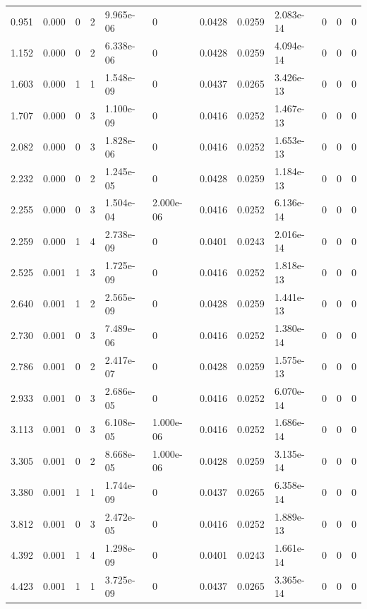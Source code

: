 \documentclass[preview]{standalone}
\begin{document}
{{\begin{tabular}{L{1.2cm}C{1.2cm} C{0.3cm}C{0.5cm} C{1.4cm}C{1.4cm} C{1.4cm}C{1.4cm} C{1.6cm}C{1.6cm} C{1.6cm}C{1.6cm}}
  0.951  &  0.000  & 0     &  2 &  9.965e-06  & 0  &  0.0428&   0.0259& 2.083e-14 & 0   &  0 & 0  \\ 
  1.152  &  0.000  & 0     &  2 &  6.338e-06  & 0  &  0.0428&   0.0259& 4.094e-14 & 0   &  0 & 0  \\ 
  1.603  &  0.000  & 1     &  1 &  1.548e-09  & 0  &  0.0437&   0.0265& 3.426e-13 & 0   &  0 & 0  \\ 
  1.707  &  0.000  & 0     &  3 &  1.100e-09  & 0  &  0.0416&   0.0252& 1.467e-13 & 0   &  0 & 0  \\ 
  2.082  &  0.000  & 0     &  3 &  1.828e-06  & 0  &  0.0416&   0.0252& 1.653e-13 & 0   &  0 & 0  \\ 
  2.232  &  0.000  & 0     &  2 &  1.245e-05  & 0  &  0.0428&   0.0259& 1.184e-13 & 0   &  0 & 0  \\ 
  2.255  &  0.000  & 0     &  3 &  1.504e-04  & 2.000e-06  &  0.0416&   0.0252& 6.136e-14 & 0   &  0 & 0  \\ 
  2.259  &  0.000  & 1     &  4 &  2.738e-09  & 0  &  0.0401&   0.0243& 2.016e-14 & 0   &  0 & 0  \\ 
  2.525  &  0.001  & 1     &  3 &  1.725e-09  & 0  &  0.0416&   0.0252& 1.818e-13 & 0   &  0 & 0  \\ 
  2.640  &  0.001  & 1     &  2 &  2.565e-09  & 0  &  0.0428&   0.0259& 1.441e-13 & 0   &  0 & 0  \\ 
  2.730  &  0.001  & 0     &  3 &  7.489e-06  & 0  &  0.0416&   0.0252& 1.380e-14 & 0   &  0 & 0  \\ 
  2.786  &  0.001  & 0     &  2 &  2.417e-07  & 0  &  0.0428&   0.0259& 1.575e-13 & 0   &  0 & 0  \\ 
  2.933  &  0.001  & 0     &  3 &  2.686e-05  & 0  &  0.0416&   0.0252& 6.070e-14 & 0   &  0 & 0  \\ 
  3.113  &  0.001  & 0     &  3 &  6.108e-05  & 1.000e-06  &  0.0416&   0.0252& 1.686e-14 & 0   &  0 & 0  \\ 
  3.305  &  0.001  & 0     &  2 &  8.668e-05  & 1.000e-06  &  0.0428&   0.0259& 3.135e-14 & 0   &  0 & 0  \\ 
  3.380  &  0.001  & 1     &  1 &  1.744e-09  & 0  &  0.0437&   0.0265& 6.358e-14 & 0   &  0 & 0  \\ 
  3.812  &  0.001  & 0     &  3 &  2.472e-05  & 0  &  0.0416&   0.0252& 1.889e-13 & 0   &  0 & 0  \\ 
  4.392  &  0.001  & 1     &  4 &  1.298e-09  & 0  &  0.0401&   0.0243& 1.661e-14 & 0   &  0 & 0  \\ 
  4.423  &  0.001  & 1     &  1 &  3.725e-09  & 0  &  0.0437&   0.0265& 3.365e-14 & 0   &  0 & 0  \\ 

\end{tabular}}}
\end{document}
